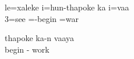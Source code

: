 \ea\label{ex:no n1}
\gll	le=xaleke i=hun-thapoke ka i=vaa\\
	3=see =-begin  =war\\
\glt	{}
\z

\ea\label{ex:no n3}
\gll thapoke ka-n vaaya\\
 begin - work\\
\glt {}
\z

%
%







